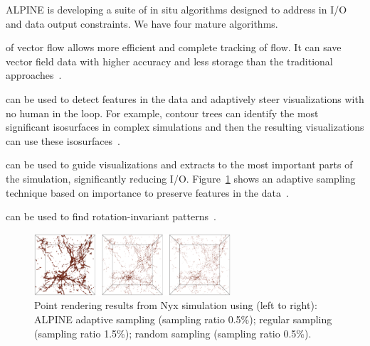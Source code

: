 ALPINE is developing a suite of in situ  algorithms designed to address in I/O and data output constraints.   We have four mature algorithms.  
\begin{description}  
	\setlength{\itemsep}{1pt}
    \setlength{\parskip}{0pt}
    \setlength{\parsep}{0pt}
	\item [Lagrangian analysis] of vector flow allows more efficient and complete tracking of flow.  It can save vector field data with higher accuracy and less storage than the traditional approaches~\cite{alpine:Sane:EGPGV18,alpine:Sane:EGPGV19,alpine:Binyahib:LDAV19}.
	\item [Topological analysis] can be used to detect features in the data and adaptively steer visualizations with no human in the loop.  For example, contour trees can identify the most significant isosurfaces in complex simulations and then the resulting visualizations can use these isosurfaces~\cite{alpine:Carr:TVCG19}.
	\item [Adaptive sampling]   can be used to guide visualizations and extracts to the most important parts of the simulation, significantly reducing I/O.  Figure~\ref{fig:alpine-sampling-example} shows an adaptive sampling technique based on importance to preserve  features in the data~\cite{alpine:Biswas:ISAV18,alpine:Dutta:Entropy19,alpine:Liu:SC19poster}.
	\item [Moments-based pattern detection] can be used to find rotation-invariant patterns~\cite{alpine:Bujack:WSCG17,alpine:Yang:PR17,alpine:Wang:TopoVis17}. 
\end{description}

\begin{figure}[htb]
	\begin{center}
		\includegraphics[width=0.65\textwidth]{projects/2.3.4-DataViz/2.3.4.16-ALPINE-ZFP/nyxSamplingExample.png}
		\caption{Point rendering results from Nyx simulation using (left to right):  ALPINE adaptive sampling  (sampling ratio 0.5\%); regular sampling  (sampling ratio 1.5\%); random sampling  (sampling ratio 0.5\%).}
		\label{fig:alpine-sampling-example}
	\end{center}
\end{figure}

